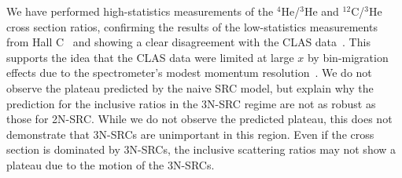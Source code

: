 \documentclass[aps,prl,superscriptaddress,showpacs,twocolumn,floatfix,amsmath,amssymb]{revtex4-1}
\def\gtorder{\mathrel{\raise.3ex\hbox{$>$}\mkern-14mu
 \lower0.6ex\hbox{$\sim$}}}
\begin{document}










%
We have performed high-statistics measurements of the $^4$He/$^3$He and $^{12}$C/$^3$He cross section
ratios, confirming the results of the low-statistics measurements from Hall C~\cite{fomin2012} and showing
a clear disagreement with the CLAS data~\cite{PhysRevLett.96.082501}. This supports the idea that the CLAS
data were limited at large $x$ by bin-migration effects due to the spectrometer's modest momentum
resolution~\cite{Higinbotham:2014xna}. We do not observe the plateau predicted by the naive SRC model, but
explain why the prediction for the inclusive ratios in the 3N-SRC regime are not as robust as those for
2N-SRC. While we do not observe the predicted plateau, this does not demonstrate that 3N-SRCs are
unimportant in this region. Even if the cross section is dominated by 3N-SRCs, the inclusive scattering
ratios may not show a plateau due to the motion of the 3N-SRCs.
\end{document}
